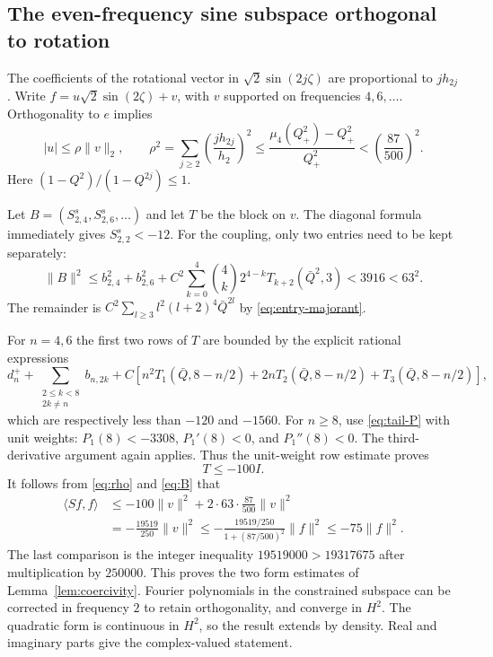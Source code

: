 \documentclass[a4paper,11pt]{article}
\numberwithin{equation}{section}
\theoremstyle{definition}
\theoremstyle{remark}
\newcommand{\norm}[1]{\lVert#1\rVert}
\newcommand{\ip}[2]{\langle#1,#2\rangle}
\begin{document}
\subsection{The even-frequency sine subspace orthogonal to rotation}
The coefficients of the rotational vector in $\sqrt2\sin(2j\zeta)$ are proportional to $j h_{2j}$. Write $f=u\sqrt2\sin(2\zeta)+v$, with $v$ supported on frequencies $4,6,\ldots$. Orthogonality to $e$ implies
\begin{equation}\label{eq:rho}
 |u|\le\rho\norm v_2,\qquad
 \rho^2=\sum_{j\ge2}\left(\frac{j h_{2j}}{h_2}\right)^2
 \le\frac{\mu_4(Q_+^2)-Q_+^2}{Q_+^2}<\left(\frac{87}{500}\right)^2.
\end{equation}
Here $(1-Q^2)/(1-Q^{2j})\le1$.

Let $B=(S^s_{2,4},S^s_{2,6},\ldots)$ and let $T$ be the block on $v$. The diagonal formula immediately gives $S^s_{2,2}<-12$. For the coupling, only two entries need to be kept separately:
\begin{equation}\label{eq:B}
 \norm B^2\le b_{2,4}^2+b_{2,6}^2+
 C^2\sum_{k=0}^4\binom4k 2^{4-k}T_{k+2}(\bar Q^2,3)
 <3916<63^2.
\end{equation}
The remainder is $C^2\sum_{l\ge3}l^2(l+2)^4\bar Q^{2l}$ by \eqref{eq:entry-majorant}.

For $n=4,6$ the first two rows of $T$ are bounded by the explicit rational expressions
\begin{equation}\label{eq:T-low}
 d_n^++\sum_{\substack{2\le k<8\\2k\ne n}}b_{n,2k}
 +C\left[n^2T_1(\bar Q,8-n/2)+2nT_2(\bar Q,8-n/2)
 +T_3(\bar Q,8-n/2)\right],
\end{equation}
which are respectively less than $-120$ and $-1560$. For $n\ge8$, use \eqref{eq:tail-P} with unit weights: $P_1(8)<-3308$, $P_1'(8)<0$, and $P_1''(8)<0$. The third-derivative argument again applies. Thus the unit-weight row estimate proves
\[
 T\le-100I.
\]
It follows from \eqref{eq:rho} and \eqref{eq:B} that
\begin{align*}
 \ip{Sf}f
 &\le-100\norm v^2+2\cdot63\cdot\frac{87}{500}\norm v^2\\
 &=-\frac{19519}{250}\norm v^2
 \le-\frac{19519/250}{1+(87/500)^2}\norm f^2
 \le-75\norm f^2.
\end{align*}
The last comparison is the integer inequality $19519000>19317675$ after multiplication by $250000$. This proves the two form estimates of Lemma~\ref{lem:coercivity}. Fourier polynomials in the constrained subspace can be corrected in frequency $2$ to retain orthogonality, and converge in $H^2$. The quadratic form is continuous in $H^2$, so the result extends by density. Real and imaginary parts give the complex-valued statement.
\end{document}
